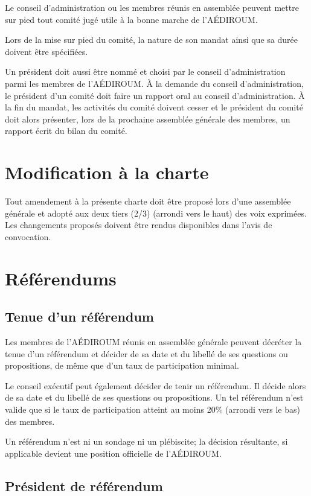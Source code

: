 \documentclass[12pt]{article}
\begin{document}
Le conseil d'administration ou les membres réunis en assemblée peuvent mettre sur pied tout comité jugé utile à la bonne marche de l'AÉDIROUM.

Lors de la mise sur pied du comité, la nature de son mandat ainsi que sa durée doivent être spécifiées.

Un président doit aussi être nommé et choisi par le conseil d'administration parmi les membres de l'AÉDIROUM. À la demande du conseil d'administration, le président d'un comité doit faire un rapport oral au conseil d'administration. À la fin du mandat, les activités du comité doivent cesser et le président du comité doit alors présenter, lors de la prochaine assemblée générale des membres, un rapport écrit du bilan du comité.

\section{Modification à la charte}

Tout amendement à la présente charte doit être proposé lors d'une assemblée générale et adopté aux deux tiers (2/3) (arrondi vers le haut) des voix exprimées. Les changements proposés doivent être rendus disponibles dans l'avis de convocation.

\section{Référendums}
\subsection{Tenue d'un référendum}
Les membres de l'AÉDIROUM réunis en assemblée générale peuvent décréter la tenue d'un référendum et décider de sa date et du libellé de ses questions ou propositions, de même que d'un taux de participation minimal.

Le conseil exécutif peut également décider de tenir un référendum. Il décide alors de sa date et du libellé de ses questions ou propositions. Un tel référendum n'est valide que si le taux de participation atteint au moins 20\% (arrondi vers le bas) des membres.

Un référendum n'est ni un sondage ni un plébiscite; la décision résultante, si applicable devient une position officielle de l'AÉDIROUM.

\subsection{Président de référendum}
\end{document}
